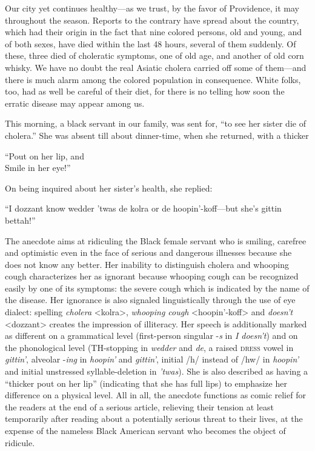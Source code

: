 \begin{ipquote}
\begin{center}
\end{center}
Our city yet continues healthy—as we trust, by the favor of Providence, it may throughout the season. Reports to the contrary have spread about the country, which had their origin in the fact that nine colored persons, old and young, and of both sexes, have died within the last 48 hours, several of them suddenly. Of these, three died of choleratic symptoms, one of old age, and another of old corn whisky. We have no doubt the real Asiatic cholera carried off some of them—and there is much alarm among the colored population in consequence. White folks, too, had as well be careful of their diet, for there is no telling how soon the erratic disease may appear among us.

{This morning, a black servant in our family, was sent for, “to see her sister die of cholera.” She was absent till about dinner-time, when she returned, with a thicker

\centering
“Pout on her lip, and\\
Smile in her eye!”

On being inquired about her sister’s health, she replied:}

“I dozzant know wedder ’twas de kolra or de hoopin’-koff—but she’s gittin bettah!”
\end{ipquote}

The anecdote aims at ridiculing the Black female servant who is smiling, carefree and optimistic even in the face of serious and dangerous illnesses because she does not know any better. Her inability to distinguish cholera and whooping cough characterizes her as ignorant because whooping cough can be recognized easily by one of its symptoms: the severe cough which is indicated by the name of the disease. Her ignorance is also signaled linguistically through the use of eye dialect: spelling \emph{cholera} <kolra>, \emph{whooping cough} <hoopin’-koff> and \emph{doesn’t} <dozzant> creates the impression of illiteracy. Her speech is additionally marked as different on a grammatical level (first-person singular -\emph{s} in \emph{I doesn’t}) and on the phonological level (TH-stopping in \emph{wedder} and \emph{de}, a raised \textsc{dress} vowel in \emph{gittin’}, alveolar -\emph{ing} in \emph{hoopin’} and \emph{gittin’}, initial /h/ instead of /hw/ in \emph{hoopin’} and initial unstressed syllable-deletion in \emph{’twas}). She is also described as having a “thicker pout on her lip” (indicating that she has full lips) to emphasize her difference on a physical level. All in all, the anecdote functions as comic relief for the readers at the end of a serious article, relieving their tension at least temporarily after reading about a potentially serious threat to their lives, at the expense of the nameless Black American servant who becomes the object of ridicule.

